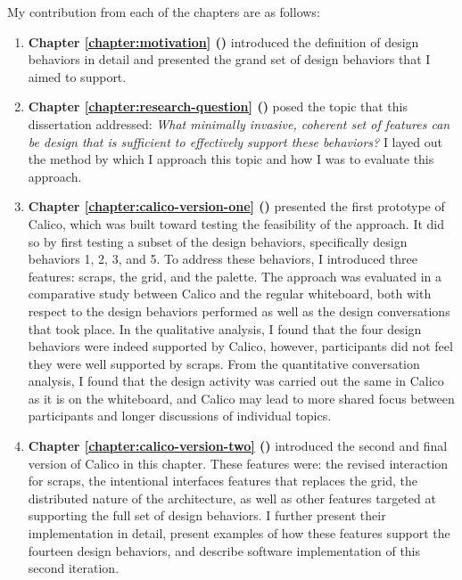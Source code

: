 My contribution from each of the chapters are as follows:

 \begin{enumerate}

   \item \textbf{Chapter \ref{chapter:motivation} ()} introduced the definition of design behaviors in detail and presented the grand set of design behaviors that I aimed to support. 

   \item \textbf{Chapter \ref{chapter:research-question} ()} posed the topic that this dissertation addressed: \textit{What minimally invasive, coherent set of features can be design that is sufficient to effectively support these behaviors?} I layed out the method by which I approach this topic and how I was to evaluate this approach.

   \item \textbf{Chapter \ref{chapter:calico-version-one} ()} presented the first prototype of Calico, which was built toward testing the feasibility of the approach. It did so by first testing a subset of the design behaviors, specifically design behaviors 1, 2, 3, and 5. To address these behaviors, I introduced three features: scraps, the grid, and the palette. The approach was evaluated in a comparative study between Calico and the regular whiteboard, both with respect to the design behaviors performed as well as the design conversations that took place. In the qualitative analysis, I found that the four design behaviors were indeed supported by Calico, however, participants did not feel they were well supported by scraps. From the quantitative conversation analysis, I found that the design activity was carried out the same in Calico as it is on the whiteboard, and Calico may lead to more shared focus between participants and longer discussions of individual topics.

   \item \textbf{Chapter \ref{chapter:calico-version-two} ()} introduced the second and final version of Calico in this chapter. These features were: the revised interaction for scraps, the intentional interfaces features that replaces the grid, the distributed nature of the architecture, as well as other features targeted at supporting the full set of design behaviors. I further present their implementation in detail, present examples of how these features support the fourteen design behaviors, and describe software implementation of this second iteration.


\end{enumerate}
